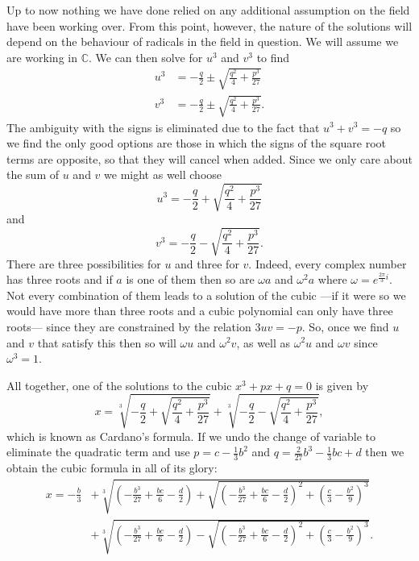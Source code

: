 \documentclass[12pt,oneside]{book}
\numberwithin{table}{section}
\numberwithin{equation}{section}
\numberwithin{figure}{section}
\newcommand{\C}{\mathbb{C}}
\begin{document}
Up to now nothing we have done relied on any additional assumption on the field have been working over. From this point, however, the nature of the solutions will depend on the behaviour of radicals in the field in question. We will assume we are working in \( \C \). We can then solve for \( u^3 \) and \( v^3 \) to find
\begin{align*}
	u^3 &= -\frac{q}{2} \pm \sqrt{\frac{q^2}{4} + \frac{p^3}{27}} \\
	v^3 &= -\frac{q}{2} \pm \sqrt{\frac{q^2}{4} + \frac{p^3}{27}}.
\end{align*}
The ambiguity with the signs is eliminated due to the fact that \( u^3 + v^3 = -q \) so we find the only good options are those in which the signs of the square root terms are opposite, so that they will cancel when added. Since we only care about the sum of \( u \) and \( v \) we might as well choose
\begin{equation*}
	u^3 = -\frac{q}{2} + \sqrt{\frac{q^2}{4} + \frac{p^3}{27}}
\end{equation*}
and 
\begin{equation*}
	v^3 = -\frac{q}{2} - \sqrt{\frac{q^2}{4} + \frac{p^3}{27}}.
\end{equation*}
There are three possibilities for \( u \) and three for \( v \). Indeed, every complex number has three roots and if \( a \) is one of them then so are \( \omega a \) and \( \omega^2 a \) where \( \omega = e^{\frac{2\pi}{3}i} \). Not every combination of them leads to a solution of the cubic ---if it were so we would have more than three roots and a cubic polynomial can only have three roots--- since they are constrained by the relation \( 3uv = -p \). So, once we find \( u \) and \( v \) that satisfy this then so will \( \omega u \) and \( \omega^2 v \), as well as \( \omega^2 u \) and \( \omega v \) since \( \omega^3 = 1 \).

All together, one of the solutions to the cubic \( x^3 + px + q = 0 \) is given by
\begin{equation*}
	x = \sqrt[3]{-\frac{q}{2} + \sqrt{\frac{q^2}{4} + \frac{p^3}{27}}} + \sqrt[3]{-\frac{q}{2} - \sqrt{\frac{q^2}{4} + \frac{p^3}{27}}},
\end{equation*}
which is known as Cardano's formula. If we undo the change of variable to eliminate the quadratic term and use \( p = c - \frac{1}{3}b^2 \) and \( q = \frac{2}{27}b^3 - \frac{1}{3}bc + d \) then we obtain the cubic formula in all of its glory:
\begin{align*}
	x = -\frac{b}{3} &+ \sqrt[3]{\left(-\frac{b^3}{27} + \frac{bc}{6} - \frac{d}{2}\right) + \sqrt{\left(-\frac{b^3}{27} + \frac{bc}{6} - \frac{d}{2}\right)^2 + \left(\frac{c}{3} - \frac{b^2}{9}\right)^3}} \\
									 & +\sqrt[3]{\left(-\frac{b^3}{27} + \frac{bc}{6} - \frac{d}{2}\right) - \sqrt{\left(-\frac{b^3}{27} + \frac{bc}{6} - \frac{d}{2}\right)^2 + \left(\frac{c}{3} - \frac{b^2}{9}\right)^3}}.
\end{align*}
\end{document}
